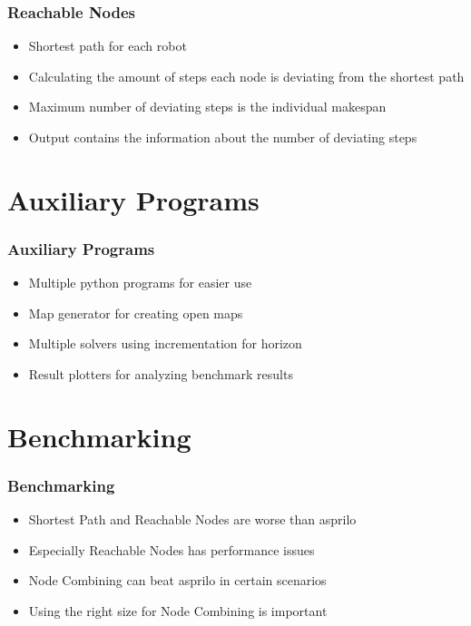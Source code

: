 \documentclass{beamer}
\begin{document}

\begin{frame}
\frametitle{Reachable Nodes}
\begin{itemize}
\item<2-> Shortest path for each robot
\medskip
\item<3-> Calculating the amount of steps each node is deviating from the shortest path
\medskip
\item<4-> Maximum number of deviating steps is the individual makespan
\medskip
\item<5-> Output contains the information about the number of deviating steps
\end{itemize}
\end{frame}


\section{Auxiliary Programs}
\begin{frame}
\frametitle{Auxiliary Programs}
\begin{itemize}
\item<2-> Multiple python programs for easier use
\medskip
\item<3-> Map generator for creating open maps
\medskip
\item<4-> Multiple solvers using incrementation for horizon
\medskip
\item<5-> Result plotters for analyzing benchmark results
\end{itemize}
\end{frame}

\section{Benchmarking}
\begin{frame}
\frametitle{Benchmarking}
\begin{itemize}
\item<2-> Shortest Path and Reachable Nodes are worse than asprilo
\medskip
\item<3-> Especially Reachable Nodes has performance issues
\medskip
\item<4-> Node Combining can beat asprilo in certain scenarios
\medskip
\item<5-> Using the right size for Node Combining is important
\end{itemize}
\end{frame}
\end{document}
